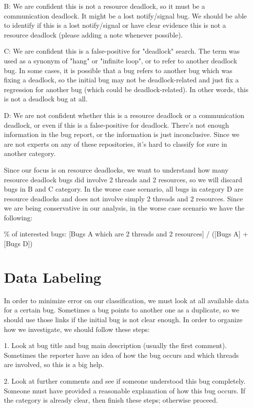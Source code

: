 B: We are confident this is not a resource deadlock, so it must be a communication deadlock. It might be a lost notify/signal bug. We should be able to identify if this is a lost notify/signal or have clear evidence this is not a resource deadlock (please adding a note whenever possible).

C: We are confident this is a false-positive for "deadlock" search. The term was used as a synonym of "hang" or "infinite loop", or to refer to another deadlock bug. In some cases, it is possible that a bug refers to another bug which was fixing a deadlock, so the initial bug may not be deadlock-related and just fix a regression for another bug (which could be deadlock-related). In other words, this is not a deadlock bug at all.

D: We are not confident whether this is a resource deadlock or a communication deadlock, or even if this is a false-positive for deadlock. There's not enough information in the bug report, or the information is just inconclusive. Since we are not experts on any of these repositories, it's hard to classify for sure in another category.

Since our focus is on resource deadlocks, we want to understand how many resource deadlock bugs did involve 2 threads and 2 resources, so we will discard bugs in B and C category. In the worse case scenario, all bugs in category D are resource deadlocks and does not involve simply 2 threads and 2 resources. Since we are being conservative in our analysis, in the worse case scenario we have the following:

\% of interested bugs: [Bugs A which are 2 threads and 2 resources] / ([Bugs A] + [Bugs D])

\section{Data Labeling}

In order to minimize error on our classification, we must look at all available data for a certain bug. Sometimes a bug points to another one as a duplicate, so we should use those links if the initial bug is not clear enough. In order to organize how we investigate, we should follow these steps:

1. Look at bug title and bug main description (usually the first comment). Sometimes the reporter have an idea of how the bug occurs and which threads are involved, so this is a big help.

2. Look at further comments and see if someone understood this bug completely. Someone must have provided a reasonable explanation of how this bug occurs. If the category is already clear, then finish these steps; otherwise proceed.

